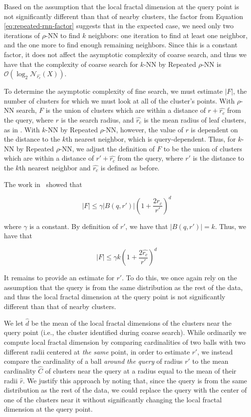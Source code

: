 Based on the assumption that the local fractal dimension at the query point is not significantly different than that of nearby clusters, the factor from Equation \ref{eq:repeated-rnn-factor} suggests that in the expected case, we need only two iterations of $\rho$-NN to find $k$ neighbors:
one iteration to find at least one neighbor, and the one more to find enough remaining neighbors.
Since this is a constant factor, it does not affect the asymptotic complexity of coarse search, and thus we have that the complexity of coarse search for $k$-NN by Repeated $\rho$-NN is $\mathcal{O}(\log_2\mathcal{N}_{\hat{r_c}}(X))$.

To determine the asymptotic complexity of fine search, we must estimate $|F|$, the number of clusters for which we must look at all of the cluster's points.
With $\rho$-NN search, $F$ is the union of clusters which are within a distance of $r + \hat{r_c}$ from the query, where $r$ is the search radius, and $\hat{r_c}$ is the mean radius of leaf clusters, as in \cite{yu2015entropy}.
With $k$-NN by Repeated $\rho$-NN, however, the value of $r$ is dependent on the distance to the $k$th nearest neighbor, which is query-dependent.
Thus, for $k$-NN by Repeated $\rho$-NN, we adjust the definition of $F$ to be the union of clusters which are within a distance of $r' + \hat{r_c}$ from the query, where $r'$ is the distance to the $k$th nearest neighbor and $\hat{r_c}$ is defined as before.

The work in~\cite{yu2015entropy} showed that

\begin{equation*}
    |F| \leq \gamma |B(q, r')|\left(1+ \frac{2\hat{r_c}}{r'}\right)^d
\end{equation*}

where $\gamma$ is a constant. 
By definition of 
$r'$, we have that $|B(q, r')| = k$. Thus, we have that

\begin{equation}
    |F| \leq \gamma k\left(1+ \frac{2\hat{r_c}}{r'}\right)^d
    \label{eq:methods:knn-by-rnn-fine-search}
\end{equation}

It remains to provide an estimate for $r'$. 
To do this, we once again rely on the assumption that the query is from the same distribution as the rest of the data, and thus the local fractal dimension at the query point is not significantly different than that of nearby clusters.

We let $\hat{d}$ be the mean of the local fractal dimensions of the clusters near the query point (i.e., the cluster identified during coarse search).
While ordinarily we compute local fractal dimension by comparing cardinalities of two balls with two different radii centered at \emph{the same} point, in order to estimate $r'$, we instead compare the cardinality of a ball \emph{around the query} of radius $r'$ to the mean cardinality $\hat{C}$ of clusters near the query at a radius equal to the mean of their radii $\hat{r}$.
We justify this approach by noting that, since the query is from the same distribution as the rest of the data, we could replace the query with the center of one of the clusters near it without significantly changing the local fractal dimension at the query point. 

